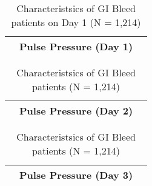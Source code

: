 \begin{table}[h]

\scriptsize{ 
\begin{tabular}{l c c c c c}
\toprule
& \multicolumn{4}{c}{\textbf{Pulse Pressure (Day 1)}}\\



\bottomrule
\end{tabular}
\caption{Characteristsics of GI Bleed patients on Day 1 (N = 1,214)}
}
\end{table}



\begin{table}[h]

\scriptsize{ 
\begin{tabular}{l c c c c c}
\toprule
& \multicolumn{4}{c}{\textbf{Pulse Pressure (Day 2)}}\\



\bottomrule
\end{tabular}
\caption{Characteristsics of GI Bleed patients (N = 1,214)}
}
\end{table}


\begin{table}[h]

\scriptsize{ 
\begin{tabular}{l c c c c c}
\toprule
& \multicolumn{4}{c}{\textbf{Pulse Pressure (Day 3)}}\\



\bottomrule
\end{tabular}
\caption{Characteristsics of GI Bleed patients (N = 1,214)}
}
\end{table}




